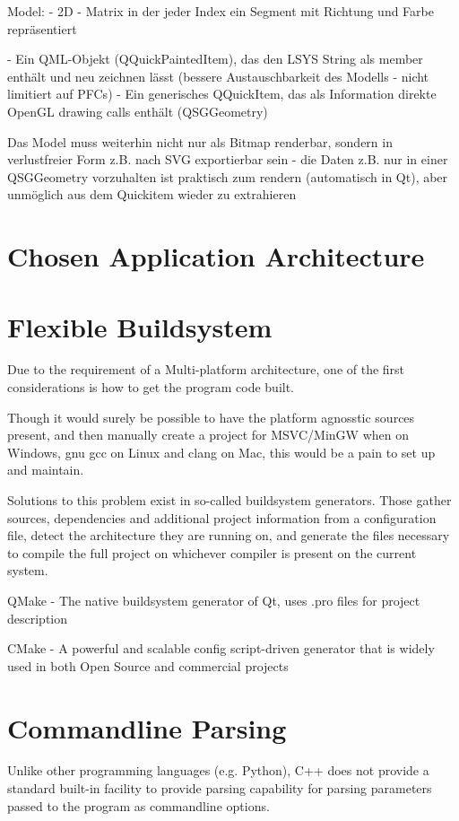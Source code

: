 Model: - 2D - Matrix in der jeder Index ein Segment mit Richtung und Farbe repräsentiert

- Ein QML-Objekt (QQuickPaintedItem), das den LSYS String als member enthält und neu zeichnen lässt (bessere Austauschbarkeit des Modells - nicht limitiert auf PFCs)
- Ein generisches QQuickItem, das als Information direkte OpenGL drawing calls enthält (QSGGeometry)

Das Model muss weiterhin nicht nur als Bitmap renderbar, sondern in verlustfreier Form z.B. nach SVG exportierbar sein - die Daten z.B. nur in einer QSGGeometry vorzuhalten ist praktisch zum rendern (automatisch in Qt), aber unmöglich aus dem Quickitem wieder zu extrahieren


\section{Chosen Application Architecture}




\section{Flexible Buildsystem}
Due to the requirement of a Multi-platform architecture, one of the first considerations is how to get the program code built.

Though it would surely be possible to have the platform agnosstic sources present, and then manually create a project for MSVC/MinGW when on Windows, gnu gcc on Linux and clang on Mac, this would be a pain to set up and maintain.

Solutions to this problem exist in so-called buildsystem generators. Those gather sources, dependencies and additional project information from a configuration file, detect the architecture they are running on, and generate the files necessary to compile the full project on whichever compiler is present on the current system.

QMake - The native buildsystem generator of Qt, uses .pro files for project description

CMake - A powerful and scalable config script-driven generator that is widely used in both Open Source and commercial projects 


\section{Commandline Parsing}
Unlike other programming languages (e.g. Python), C++ does not provide a standard built-in facility to provide parsing capability for parsing parameters passed to the program as commandline options.

